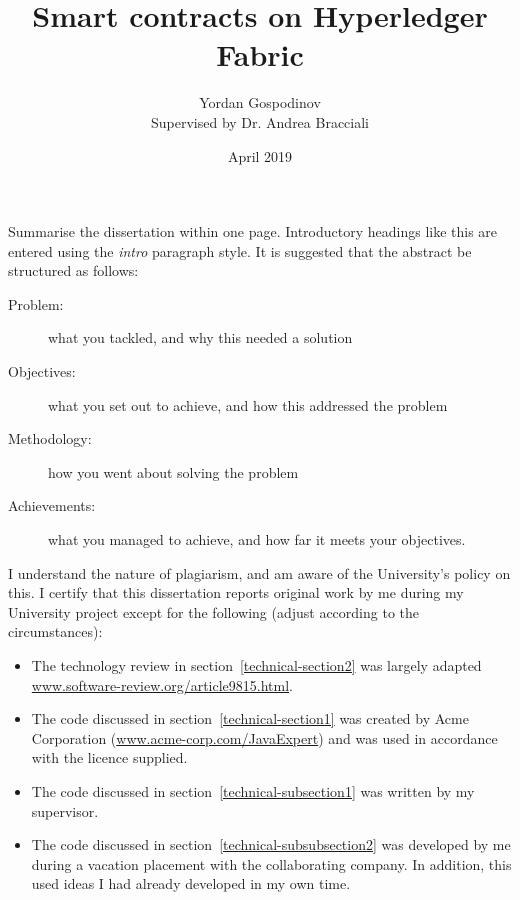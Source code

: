\documentclass[a4paper,11pt]{report}
\title{Smart contracts on Hyperledger Fabric}
\author{
{Yordan Gospodinov} \\
{\small{Supervised by Dr. Andrea Bracciali}}
}
\date{April 2019}
\begin{document}
\maketitle				





Summarise the dissertation within one page. Introductory headings like this are
entered using the {\it intro} paragraph style. It is suggested that the abstract
be structured as follows:

\begin{description}

  \item[Problem:]
  what you tackled, and why this needed a solution

  \item[Objectives:]
  what you set out to achieve, and how this addressed the problem

  \item[Methodology:]
  how you went about solving the problem

  \item[Achievements:]
  what you managed to achieve, and how far it meets your objectives.

\end{description}




I understand the nature of plagiarism, and am aware of the University's policy
on this. I certify that this dissertation reports original work by me during my
University project except for the following (adjust according to the
circumstances):

\begin{itemize}

  \item
  The technology review in section~\ref{technical-section2} was largely adapted
  \url{www.software-review.org/article9815.html}.

  \item
  The code discussed in section~\ref{technical-section1} was created by Acme
  Corporation (\url{www.acme-corp.com/JavaExpert}) and was used in accordance
  with the licence supplied.

  \item
  The code discussed in section~\ref{technical-subsection1} was written by my
  supervisor.

  \item
  The code discussed in section~\ref{technical-subsubsection2} was developed by
  me during a vacation placement with the collaborating company. In addition,
  this used ideas I had already developed in my own time.

\end{itemize}
\end{document}
